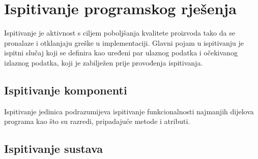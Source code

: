 			\eject 
		
	
		\section{Ispitivanje programskog rješenja}
			
			
			 
			 Ispitivanje je aktivnost s ciljem poboljšanja kvalitete proizvoda tako da se pronalaze i otklanjaju greške u implementaciji. Glavni pojam u ispitivanju je ispitni slučaj koji se definira kao uređeni par ulaznog podatka i očekivanog izlaznog podatka, koji je zabilježen prije provođenja ispitivanja.
	
			
			\subsection{Ispitivanje komponenti}
			
			Ispitivanje jedinica podrazumijeva ispitivanje funkcionalnosti najmanjih dijelova programa kao što su razredi, pripadajuće metode i atributi.
			
			
			
			\subsection{Ispitivanje sustava}
			
			 

